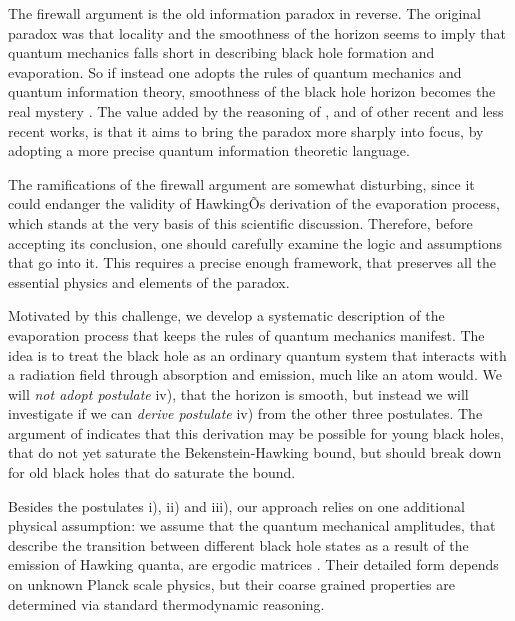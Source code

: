 \documentclass[12pt]{article}%
\begin{document}
The firewall argument is the old information paradox in reverse. The original paradox was that 
locality and the smoothness of the horizon seems to imply that quantum mechanics falls short in describing black hole formation and evaporation.
So if instead one adopts the rules of quantum mechanics and quantum information theory, smoothness of the black hole horizon becomes the real mystery \cite{mathur-info-paradox}.
The value added by the reasoning of \cite{amps}, and of other recent  \cite{haydenpreskill, fastscrambler, avery, giddings-qu-info} and less recent  \cite{page-subsystem, page-bh-info} works, is that it aims to bring the paradox more sharply into focus, by adopting a
more precise  quantum information theoretic language. 

The ramifications of the firewall argument are somewhat disturbing, since it could endanger the validity of HawkingÕs derivation of the evaporation process,
which stands at the very basis of this scientific discussion. Therefore, before accepting its conclusion, one should carefully
 examine the logic and assumptions that go into it. This requires a precise enough framework, that preserves all the essential physics and elements of the paradox.

Motivated by this challenge, we develop a systematic description of the evaporation process that
keeps the rules of quantum mechanics manifest.
The idea is to treat the black hole as an ordinary quantum system that interacts with a radiation field through 
absorption and emission, much like an atom would. We  will {\it not adopt postulate} iv), that the horizon is smooth, but instead we will investigate
if we can {\it derive postulate} iv) from the other three postulates. The argument of \cite{amps} indicates that this derivation
may be possible for young black holes, that do not yet saturate the Bekenstein-Hawking bound, but should break down for old black holes that do saturate the bound.


Besides the postulates i), ii) and iii), our approach relies on one additional physical assumption: we assume that
 the quantum mechanical amplitudes, that describe the transition between different black hole states as a result of the emission of Hawking quanta,
 are ergodic matrices \cite{fastscrambler}. Their detailed form depends on unknown Planck  scale physics,  but their coarse grained properties are determined via standard
 thermodynamic reasoning. 
 
\end{document}
